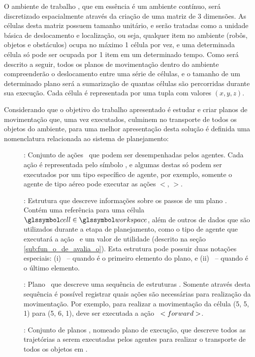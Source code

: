 O ambiente de trabalho , que em essência é um ambiente contínuo, será discretizado espacialmente através da criação de uma matriz de 3 dimensões.
As células desta matriz possuem tamanho unitário, e serão tratadas como a unidade básica de deslocamento e localização, ou seja, qualquer item no ambiente (robôs, objetos e obstáculos) ocupa no máximo 1 célula por vez, e uma determinada célula só pode ser ocupada por 1 item em um determinado tempo.
Como será descrito a seguir, todos os planos de movimentação dentro do ambiente compreenderão o deslocamento entre uma série de células, e o tamanho de um determinado plano será a sumarização de quantas células são percorridas durante sua execução.
Cada célula  é representada por uma tupla com valores $(x, y, z)$.

Considerando que o objetivo do trabalho apresentado é estudar e criar planos de movimentação que, uma vez executados, culminem no transporte de todos os objetos do ambiente, para uma melhor apresentação desta solução é definida uma nomenclatura relacionada ao sistema de planejamento:

\begin{description}
  \item[]: Conjunto de ações \movementslist\ que podem ser desempenhadas pelos agentes. Cada ação é representada pelo símbolo , e algumas destas só podem ser executados por um tipo específico de agente, por exemplo, somente o agente de tipo aéreo pode executar as ações $<$\movementup, \movementdown$>$.
  \item[]: Estrutura que descreve informações sobre os passos de um plano . Contém uma referência para uma célula $\sy{cell} \in \sy{workspace}$, além de outros de dados que são utilizados durante a etapa de planejamento, como o tipo de agente que executará a ação \ e um valor de utilidade (descrito na seção \ref{sub:fun_o_de_avalia_o}).
  Esta estrutura pode possuir duas notações especiais: (i) \originstate\ -- quando é o primeiro elemento do plano, e (ii) \targetstate\ -- quando é o último elemento.
  \item[]: Plano \planlist\ que descreve uma sequência de estruturas . Somente através desta sequência é possível registrar quais ações são necessárias para realização da movimentação. Por exemplo, para realizar a movimentação da célula  (5, 5, 1) para  (5, 6, 1), deve ser executada a ação \ $<forward>$.
  \item[]: Conjunto de planos \planset, nomeado plano de execução, que descreve todos as trajetórias a serem executadas pelos agentes para realizar o transporte de todos os objetos em \objectset.
\end{description}

